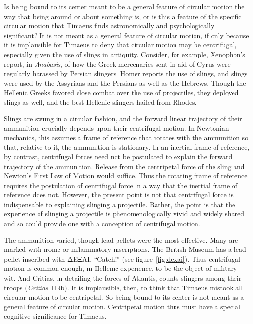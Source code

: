 Is being bound to its center meant to be a general feature of circular motion the way that being around or about something is, or is this a feature of the specific circular motion that Timaeus finds astronomically and psychologically significant? It is not meant as a general feature of circular motion, if only because it is implausible for Timaeus to deny that circular motion may be centrifugal, especially given the use of slings in antiquity. Consider, for example, Xenophon's report, in \emph{Anabasis}, of how the Greek mercenaries sent in aid of Cyrus were regularly harassed by Persian slingers. Homer reports the use of slings, and slings were used by the Assyrians and the Persians as well as the Hebrews. Though the Hellenic Greeks favored close combat over the use of projectiles, they deployed slings as well, and the best Hellenic slingers hailed from Rhodes. 

Slings are swung in a circular fashion, and the forward linear trajectory of their ammunition crucially depends upon their centrifugal motion. In Newtonian mechanics, this assumes a frame of reference that rotates with the ammunition so that, relative to it, the ammunition is stationary. In an inertial frame of reference, by contrast, centrifugal forces need not be postulated to explain the forward trajectory of the ammunition. Release from the centripetal force of the sling and Newton's First Law of Motion would suffice. Thus the rotating frame of reference requires the postulation of centrifugal force in a way that the inertial frame of reference does not. However, the present point is not that centrifugal force is indispensable to explaining slinging a projectile. Rather, the point is that the experience of slinging a projectile is phenomenologically vivid and widely shared and so could provide one with a conception of centrifugal motion.

The ammunition varied, though lead pellets were the most effective. Many are marked with ironic or inflammatory inscriptions. The British Museum has a lead pellet inscribed with {\sbl ΔΕΞΑΙ}, ``Catch!'' (see figure~\ref{fig:dexai}). Thus centrifugal motion is common enough, in Hellenic experience, to be the object of military wit. And Critias, in detailing the forces of Atlantis, counts slingers among their troops (\emph{Critias} 119b). It is implausible, then, to think that Timaeus mistook all circular motion to be centripetal. So being bound to its center is not meant as a general feature of circular motion. Centripetal motion thus must have a special cognitive significance for Timaeus.

